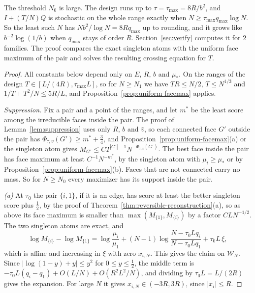 The threshold $N_0$ is large. The design runs up to $\tau=\tau_{\max}=8R/b^2$, and $I+(T/N)Q$
is stochastic on the whole range exactly when $N\ge \tau_{\max}q_{\max}\log N$. So the least such $N$ has
$Nb^2/\log N=8Rq_{\max}$ up to rounding, and it grows like $b^{-2}\log(1/b)$ when $q_{\max}$ stays
of order $R$. Section~\ref{sec:verify} computes it for 2 families. The proof compares the exact
singleton atoms with the uniform face maximum of the pair and solves the resulting crossing
equation for $T$.

\begin{proof}
All constants below depend only on $E$, $R$, $b$ and $\mu_*$. On the ranges of the design
$T\in[L/(4R),\tau_{\max}L]$, so for $N\ge N_1$ we have $TR\le N/2$, $T\le N^{1/3}$ and
$1/T+T^2/N\le5R/L$, and Proposition~\ref{prop:uniform-facemax} applies.

\emph{Suppression.} Fix a pair and a point of the ranges, and let $m^*$ be the least score among
the irreducible faces inside the pair. The proof of Lemma~\ref{lem:suppression} uses only $R$,
$b$ and $\bar v$, so each connected face $G'$ outside the pair has
$\Phi_{\tau,v}(G')\ge m^*+\frac34$, and Proposition~\ref{prop:uniform-facemax}(a) or the singleton
atom gives $M_{G'}\le CT^{|G'|-1}N^{-\Phi_{\tau,v}(G')}$. The best face inside the pair has face
maximum at least $C^{-1}N^{-m^*}$, by the singleton atom with $\mu_i\ge\mu_*$ or by
Proposition~\ref{prop:uniform-facemax}(b). Faces that are not connected carry no mass. So for
$N\ge N_0$ every maximizer has its support inside the pair.

\emph{(a)} At $\tau_0$ the pair $\{i,1\}$, if it is an edge, has score at least the better
singleton score plus $\frac12$, by the proof of Theorem~\ref{thm:reversible-reconstruction}(a), so
as above its face maximum is smaller than $\max(M_{\{1\}},M_{\{i\}})$ by a factor $CLN^{-1/2}$.
The two singleton atoms are exact, and
\[
 \log M_{\{i\}}-\log M_{\{1\}}=\log\frac{\mu_i}{\mu_1}+(N-1)\log\frac{N-\tau_0Lq_i}{N-\tau_0Lq_1}+\tau_0L\,\xi ,
\]
which is affine and increasing in $\xi$ with zero $x_{i,N}$. This gives the claim on
$\mathcal W_N$. Since $|\log(1-y)+y|\le y^2$ for $0\le y\le\frac12$, the middle term is
$-\tau_0L(q_i-q_1)+O(L/N)+O(R^2L^2/N)$, and dividing by $\tau_0L=L/(2R)$ gives the expansion. For
large $N$ it gives $x_{i,N}\in(-3R,3R)$, since $|x_i|\le R$.


\end{proof}
